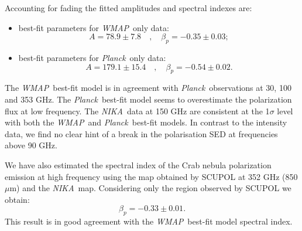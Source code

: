 \documentclass[twocolumn,traditabstract]{aa}
\def\NIKA{\textit{NIKA}}
\def\Planck{\textit{Planck}}
\def\WMAP{\textit{WMAP}}
\begin{document}
Accounting for fading the fitted amplitudes and spectral indexes are:
\begin{itemize}
\item best-fit parameters for \WMAP\ only data:
\begin{equation}
A = 78.9\pm7.8 \quad , \quad \beta_p = -0.35\pm0.03;
\end{equation}
\item best-fit parameters for \Planck\ only data:
\begin{equation}
A = 179.1\pm15.4 \quad , \quad \beta_p = -0.54\pm0.02.
\end{equation}
\end{itemize}

The \WMAP\ best-fit model is in agreement with \Planck\ observations at 30, 100 and 353 GHz.
The \Planck\ best-fit model seems to overestimate the polarization flux at low frequency. 
The \NIKA\ data at 150 GHz are consistent at the 1$\sigma$ level with both the \WMAP\ and \Planck\ best-fit models.
In contrast to the intensity data, we find no clear hint of a break in the polarisation SED at frequencies above 90 GHz.


We have also estimated the spectral index of the Crab nebula polarization emission at high frequency using the map obtained by SCUPOL at 352 GHz (850 $\mu$m) and the \NIKA\ map. Considering only the region observed by SCUPOL we obtain:
\begin{equation}
\beta_p = -0.33 \pm 0.01.
\end{equation}
This result is in good agreement with the \WMAP\ best-fit model spectral index.
\end{document}
